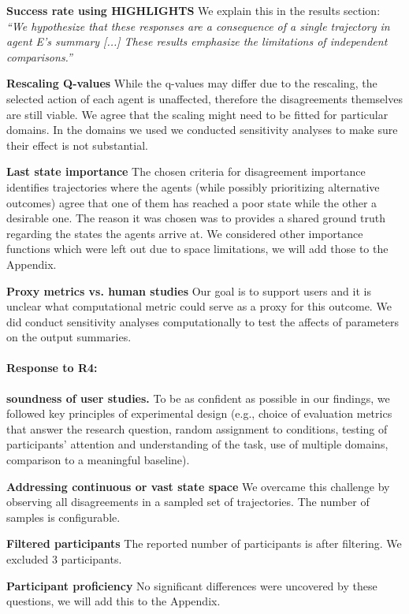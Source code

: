 \textbf{Success rate using HIGHLIGHTS}
We explain this in the results section: \textit{``We hypothesize that these responses are a consequence of a single trajectory in agent E’s summary [...] These results emphasize the limitations of independent comparisons.''}

\textbf{Rescaling Q-values}
While the q-values may differ due to the rescaling, the selected action of each agent is unaffected, therefore the disagreements themselves are still viable.
We agree that the scaling might need to be fitted for particular domains. In the domains we used we conducted sensitivity analyses to make sure their effect is not substantial.

\textbf{Last state importance}
The chosen criteria for disagreement importance identifies trajectories where the agents (while possibly prioritizing alternative outcomes) agree that one of them has reached a poor state while the other a desirable one. The reason it was chosen was to provides a shared ground truth regarding the states the agents arrive at.
We considered other importance functions which were left out due to space limitations, we will add those to the Appendix.

\textbf{Proxy metrics vs. human studies}
Our goal is to support users and it is unclear what computational metric could serve as a proxy for this outcome. We did conduct sensitivity analyses computationally to test the affects of parameters on the output summaries. 


\paragraph{Response to R4:}
\textbf{soundness of user studies.}
To be as confident as possible in our findings, we followed key principles of experimental design (e.g., choice of evaluation metrics that answer the research question, random assignment to conditions, testing of participants’ attention and understanding of the task, use of multiple domains, comparison to a meaningful baseline). 

\textbf{Addressing continuous or vast state space}
We overcame this challenge by observing all disagreements in a sampled set of trajectories. The number of samples is configurable.

\textbf{Filtered participants}
The reported number of participants is after filtering. We excluded 3 participants.

\textbf{Participant proficiency}
No significant differences were uncovered by these questions, we will add this to the Appendix.

